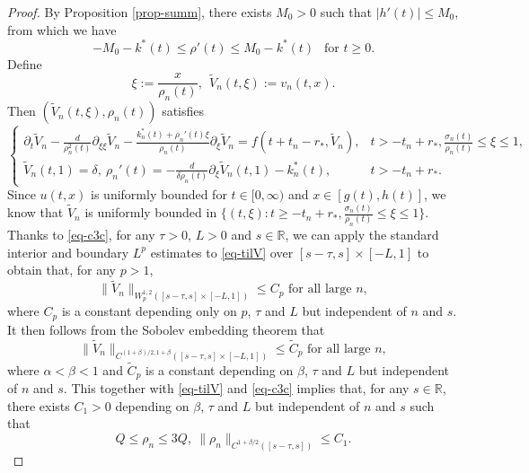 \documentclass[11pt]{amsart}
\numberwithin{equation}{section}
\begin{document}
\begin{proof}
  By Proposition \ref{prop-summ}, there exists $M_0>0$ such  that $|h'(t)|\leq M_0$, from which we have
  \begin{equation*}
    -M_0-k^*(t)\leq \rho'(t)\leq M_0-k^*(t) ~~\text{ for }t\geq 0.
  \end{equation*}
Define
\begin{equation*}
  \xi:=\frac{x}{\rho_n(t)}, ~~\tilde{V}_n(t,\xi):=v_n(t,x).
\end{equation*}
Then $(\tilde{V}_n(t,\xi),\rho_n(t))$ satisfies
\begin{equation}\label{eq-tilV}
  \begin{cases}
   \partial_t\tilde{V}_n-\frac{d}{\rho_n^2(t)}\partial_{\xi\xi}\tilde{V}_n-\frac{k^*_n(t)+\rho_n'(t)\xi}{\rho_n(t)}\partial_\xi\tilde{V}_n=f(t+t_n-r_*,\tilde{V}_n),&t>-t_n+r_*,\frac{\sigma_n(t)}{\rho_n(t)}\leq\xi\leq 1,\\[2mm]
   \tilde{V}_n(t,1)=\delta,~ \rho_n'(t)=-\frac{d}{\delta\rho_n(t)}\partial_\xi\tilde{V}_n(t,1)-k^*_n(t), &t>-t_n+r_*.
\end{cases}
\end{equation}
Since $u(t,x)$ is uniformly bounded for $t\in[0,\infty)$ and $x\in[g(t),h(t)]$, we know that $\tilde{V}_n$ is uniformly bounded in $\{(t,\xi):t\geq -t_n+r_*, \frac{\sigma_n(t)}{\rho_n(t)}\leq\xi\leq 1 \}$.  Thanks to \eqref{eq-c3c}, for any $\tau>0$, $L>0$  and $s\in\mathbb{R}$, we can apply the standard  interior and boundary $L^p$ estimates to \eqref{eq-tilV} over $[s-\tau,s]\times[-L,1]$ to obtain that, for any $p>1$,
\begin{equation*}
  \|\tilde{V}_n\|_{W_p^{1,2}([s-\tau,s]\times[-L,1])}\leq C_p \text{ for all large }n,
\end{equation*}
where $C_p$ is a constant depending only on $p$, $\tau$ and $L$ but independent of $n$ and $s$. It then follows from the  Sobolev  embedding  theorem that 
\begin{equation*}
  \|\tilde{V}_n\|_{C^{(1+\beta)/2,1+\beta}([s-\tau,s]\times[-L,1])}\leq \tilde{C}_p  \text{ for all large }n,
\end{equation*}
where $\alpha<\beta<1$ and $\tilde{C}_p$ is a constant depending  on $\beta$, $\tau$ and $L$ but independent of $n$ and $s$.
This together with \eqref{eq-tilV} and \eqref{eq-c3c} implies that, for any $s\in\mathbb{R}$, there exists $C_1>0$ depending  on $\beta$, $\tau$ and $L$ but independent of $n$ and $s$ such that 
\begin{equation*}
 Q\leq \rho_n\leq 3Q,\  \|\rho_n\|_{C^{1+\beta/2}([s-\tau,s])}\leq C_1.

\end{equation*}
\end{proof}
\end{document}
